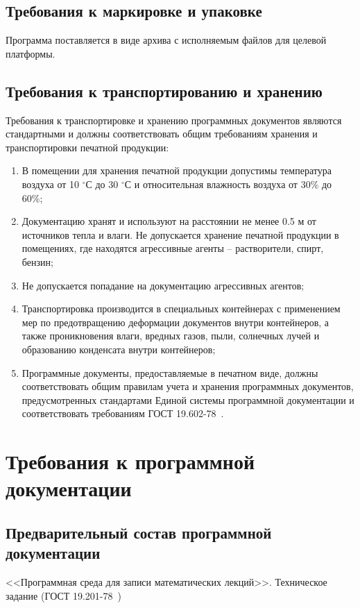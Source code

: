 \documentclass[techtask]{espd}
\begin{document}
\subsection{Требования к маркировке и упаковке}
Программа поставляется в виде архива с исполняемым файлов для целевой платформы.

\subsection{Требования к транспортированию и хранению}
Требования к транспортировке и хранению программных документов являются стандартными и должны соответствовать общим требованиям хранения и транспортировки печатной продукции:

\begin{enumerate}
\item В помещении для хранения печатной продукции допустимы температура воздуха от 10 $^\circ$С до 30 $^\circ$С и относительная влажность воздуха от 30\% до 60\%;
\item Документацию хранят и используют на расстоянии не менее 0.5 м от источников тепла и влаги. Не допускается хранение печатной продукции в помещениях, где находятся агрессивные агенты – растворители, спирт, бензин;
\item Не допускается попадание на документацию агрессивных агентов;
\item Транспортировка производится в специальных контейнерах с применением мер по предотвращению деформации документов внутри контейнеров, а также проникновения влаги, вредных газов, пыли, солнечных лучей и образованию конденсата внутри контейнеров;
\item Программные документы, предоставляемые в печатном виде, должны соответствовать общим правилам учета и хранения программных документов, предусмотренных стандартами Единой системы программной документации и соответствовать требованиям ГОСТ 19.602-78~\cite{espd602}.
\end{enumerate}

\section{Требования к программной документации}
\subsection{Предварительный состав программной документации}\label{subsection:documentation}
<<Программная среда для записи математических лекций>>. Техническое задание (ГОСТ 19.201-78~\cite{espd201})
\end{document}
